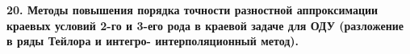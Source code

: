 \documentclass[a4paper,14pt]{article}
\begin{document}
\textbf{20. Методы повышения порядка точности разностной аппроксимации краевых условий 2-го и 3-его рода в краевой задаче для ОДУ (разложение в ряды Тейлора и интегро- интерполяционный метод).}
\newpage
\begin{figure}[!h]
	\label{fig:t201}
\end{figure}
\newpage
\end{document}
